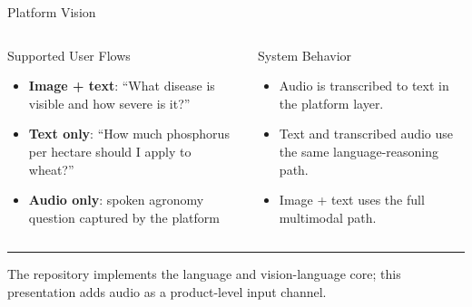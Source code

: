 \documentclass[aspectratio=169,11pt]{beamer}
\newcommand{\accentline}{\textcolor{AgroGold}{\rule{\linewidth}{1.1pt}}}
\begin{document}
\begin{frame}{Platform Vision}
\begin{columns}[T]
    \begin{block}{Supported User Flows}
    \begin{itemize}
        \item \textbf{Image + text}: ``What disease is visible and how severe is it?''
        \item \textbf{Text only}: ``How much phosphorus per hectare should I apply to wheat?''
        \item \textbf{Audio only}: spoken agronomy question captured by the platform
    \end{itemize}
    \end{block}

    \begin{block}{System Behavior}
    \begin{itemize}
        \item Audio is transcribed to text in the platform layer.
        \item Text and transcribed audio use the same language-reasoning path.
        \item Image + text uses the full multimodal path.
    \end{itemize}
    \end{block}
\end{columns}
\vspace{0.5em}
\accentline
\vspace{0.2em}
\small The repository implements the language and vision-language core; this presentation adds audio as a product-level input channel.
\end{frame}
\end{document}
